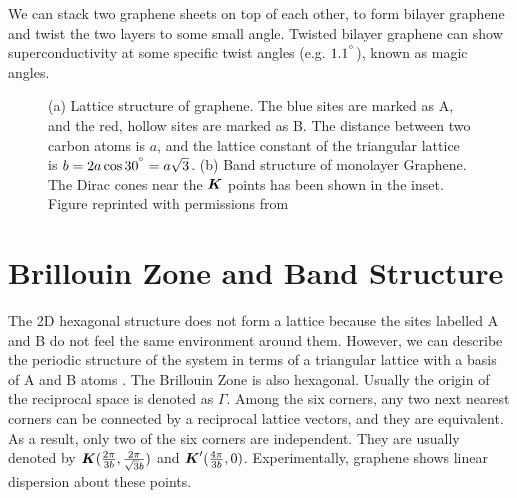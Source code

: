 \documentclass{report}
\renewcommand\vec[1]{\ensuremath\boldsymbol{#1}} %
\begin{document}
We can stack two graphene sheets on top of each other, to form bilayer graphene and twist the two layers to some small angle. Twisted bilayer graphene can show superconductivity \cite{Cao2018TBLSuperconductivity} at some specific twist angles (e.g. $1.1^{\degree}$), known as magic angles.

\begin{figure}[h!]
	\centering
	\caption{(a) Lattice structure of graphene. The blue sites are marked as A, and the red, hollow sites are marked as B. The distance between two carbon atoms is $a$, and the lattice constant of the triangular lattice is $b = 2 a \cos{30^{\degree}} = a\sqrt{3}$. (b) Band structure of monolayer Graphene. The Dirac cones near the $\vec{K}$ points has been shown in the inset. Figure reprinted with permissions from \cite{TheElPropGraphene}}
	\label{fig:GrapheneBandStructure}
\end{figure}

\section{Brillouin Zone and Band Structure}
The 2D hexagonal structure does not form a lattice because the sites labelled A and B do not feel the same environment around them. However, we can describe the periodic structure of the system in terms of a triangular lattice with a basis of A and B atoms \cite{book:SimonSolidState}. The Brillouin Zone is also hexagonal. Usually the origin of the reciprocal space is denoted as $\Gamma$. Among the six corners, any two next nearest corners can be connected by a reciprocal lattice vectors, and they are equivalent. As a result, only two of the six corners are independent. They are usually denoted by $\vec{K} (\frac{2\pi}{3b},\frac{2\pi}{\sqrt{3} b})$ and $\vec{K}'(\frac{4\pi}{3b},0)$. Experimentally, graphene shows linear dispersion about these points.
\end{document}
